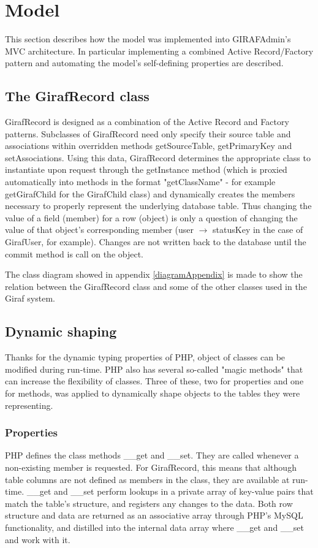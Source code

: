 \section{Model}
\label{model}
This section describes how the model was implemented into GIRAFAdmin's MVC architecture. In particular implementing a combined Active Record/Factory pattern and automating the model's self-defining properties are described.

\subsection{The GirafRecord class}
GirafRecord is designed as a combination of the Active Record and Factory patterns. Subclasses of GirafRecord need only specify their source table and associations within overridden methods getSourceTable, getPrimaryKey and setAssociations. Using this data, GirafRecord determines the appropriate class to instantiate upon request through the getInstance method (which is proxied automatically into methods in the format "getClassName" - for example getGirafChild for the GirafChild class) and dynamically creates the members necessary to properly represent the underlying database table. Thus changing the value of a field (member) for a row (object) is only a question of changing the value of that object's corresponding member (user $\rightarrow$ statusKey in the case of GirafUser, for example). Changes are not written back to the database until the commit method is call on the object.

The class diagram showed in appendix \ref{diagramAppendix} is made to show the relation between the GirafRecord class and some of the other classes used in the Giraf system.

\subsection{Dynamic shaping}
Thanks for the dynamic typing properties of PHP, object of classes can be modified during run-time. PHP also has several so-called "magic methods" that can increase the flexibility of classes. Three of these, two for properties and one for methods, was applied to dynamically shape objects to the tables they were representing.

\subsubsection*{Properties}
PHP defines the class methods __get and __set. They are called whenever a non-existing member is requested. For GirafRecord, this means that although table columns are not defined as members in the class, they are available at run-time. __get and __set perform lookups in a private array of key-value pairs that match the table's structure, and registers any changes to the data.
Both row structure and data are returned as an associative array through PHP's MySQL functionality, and distilled into the internal data array where __get and __set and work with it.

